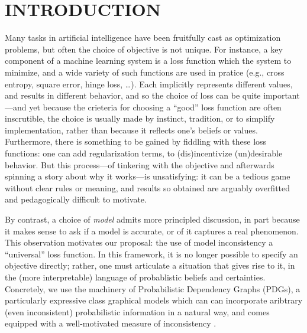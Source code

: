 \documentclass[twoside]{article}
\theoremstyle{plain}
\theoremstyle{definition}
\begin{document}
\section{INTRODUCTION}
Many tasks in artificial intelligence have been fruitfully cast as optimization problems, but often the choice of objective is not unique.
%
For instance, a key component of a machine learning system is a loss function which the system to minimize, and a wide variety of such functions are used in pratice (e.g., cross entropy, square error, hinge loss, \ldots).
Each implicitly represents different values, and results in different behavior, and so the choice of loss can be quite important---and yet because the crieteria for choosing a ``good'' loss function are often inscrutible, the choice is usually made by instinct, tradition, or to simplify implementation, rather than because it reflects one's beliefs or values.
Furthermore, there is something to be gained by fiddling with these loss functions: one can add regularization terms, to (dis)incentivize (un)desirable behavior.
But this process---of tinkering with the objective and afterwards spinning a story about why it works---is unsatisfying:
it can be a tedious game without clear rules or meaning, and results so obtained are arguably overfitted and pedagogically difficult to motivate.
%


By contrast, a choice of \emph{model} admits more principled discussion, in part because it makes sense to ask if a model is accurate, or of it captures a real phenomenon.
This observation motivates our proposal: the use of model inconsistency a ``universal'' loss function. In this framework, it is no longer possible to specify an objective directly; rather, one must articulate a situation that gives rise to it, in the (more interpretable) language of probablistic beliefs and certainties. %
Concretely, we use the machinery of Probabilistic Dependency Graphs (PDGs), a particularly expressive class graphical models which can can incorporate aribtrary (even inconsistent) probabilistic information in a natural way, and comes equipped with a well-motivated measure of inconsistency  \cite{richardson2020probabilistic}.
\end{document}
